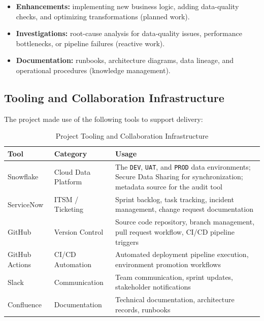 \begin{itemize}
    \item \textbf{Enhancements:} implementing new business logic, adding data-quality checks, and optimizing transformations (planned work).
    \item \textbf{Investigations:} root-cause analysis for data-quality issues, performance bottlenecks, or pipeline failures (reactive work).
    \item \textbf{Documentation:} runbooks, architecture diagrams, data lineage, and operational procedures (knowledge management).
\end{itemize}

\subsection{Tooling and Collaboration Infrastructure}

The project made use of the following tools to support delivery:

\begin{table}[H]
  \centering
  \begin{tabularx}{\textwidth}{l l X}
    \toprule
    \rowcolor{ibmblue!15}
    \textbf{Tool} & \textbf{Category} & \textbf{Usage} \\
    \midrule
    Snowflake  & Cloud Data Platform    & The \texttt{DEV}, \texttt{UAT}, and \texttt{PROD} data environments; Secure Data Sharing for synchronization; metadata source for the audit tool \\
    ServiceNow & ITSM / Ticketing       & Sprint backlog, task tracking, incident management, change request documentation \\
    GitHub     & Version Control        & Source code repository, branch management, pull request workflow, CI/CD pipeline triggers \\
    GitHub Actions & CI/CD Automation   & Automated deployment pipeline execution, environment promotion workflows \\
    Slack      & Communication          & Team communication, sprint updates, stakeholder notifications \\
    Confluence & Documentation          & Technical documentation, architecture records, runbooks \\
    \bottomrule
  \end{tabularx}
  \caption{Project Tooling and Collaboration Infrastructure}
  \label{tab:tools}
\end{table}

